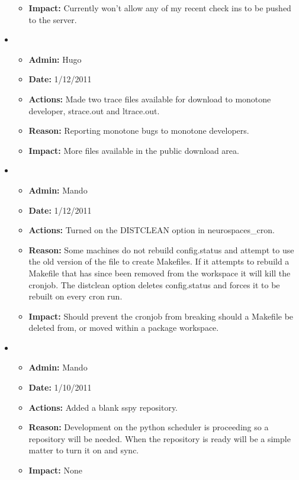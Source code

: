 \documentclass[12pt]{article}
\begin{document}
\begin{itemize}
\begin{itemize}
\item[] {\bf Impact:} Currently won't allow any of my recent check ins to be pushed to the server. 
\end{itemize}

\item
\begin{itemize}
\item[] {\bf Admin:} Hugo
\item[] {\bf Date:} 1/12/2011 
\item[] {\bf Actions:} Made two trace files available for download to monotone developer, strace.out and ltrace.out.
\item[] {\bf Reason:} Reporting monotone bugs to monotone developers.
\item[] {\bf Impact:} More files available in the public download area.
\end{itemize}

\item
\begin{itemize}
\item[] {\bf Admin:} Mando
\item[] {\bf Date:} 1/12/2011 
\item[] {\bf Actions:} Turned on the DISTCLEAN option in neurospaces\_cron.
\item[] {\bf Reason:} Some machines do not rebuild config.status and attempt to use the old version of the file to create Makefiles. If it attempts to rebuild a Makefile that has since been removed from the workspace it will kill the cronjob. The distclean option deletes config.status and forces it to be rebuilt on every cron run. 
\item[] {\bf Impact:} Should prevent the cronjob from breaking should a Makefile be deleted from, or moved within a package workspace.
\end{itemize}

\item
\begin{itemize}
\item[] {\bf Admin:} Mando
\item[] {\bf Date:} 1/10/2011 
\item[] {\bf Actions:} Added a blank sspy repository.
\item[] {\bf Reason:} Development on the python scheduler is proceeding so a repository will be needed. When the repository is ready will be a simple matter to turn it on and sync. 
\item[] {\bf Impact:} None
\end{itemize}


\end{itemize}
\end{document}

